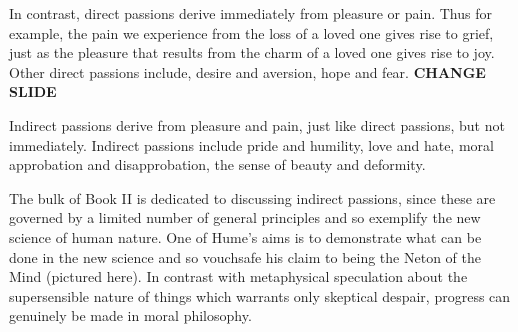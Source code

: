 In contrast, direct passions derive immediately from pleasure or pain. Thus for example, the pain we experience from the loss of a loved one gives rise to grief, just as the pleasure that results from the charm of a loved one gives rise to joy. Other direct passions include, desire and aversion, hope and fear. \textbf{CHANGE SLIDE}

Indirect passions derive from pleasure and pain, just like direct passions, but not immediately. Indirect passions include pride and humility, love and hate, moral approbation and disapprobation, the sense of beauty and deformity.

The bulk of Book II is dedicated to discussing indirect passions, since these are governed by a limited number of general principles and so exemplify the new science of human nature. One of Hume's aims is to demonstrate what can be done in the new science and so vouchsafe his claim to being the Neton of the Mind (pictured here). In contrast with metaphysical speculation about the supersensible nature of things which warrants only skeptical despair, progress can genuinely be made in moral philosophy. \change

% 


